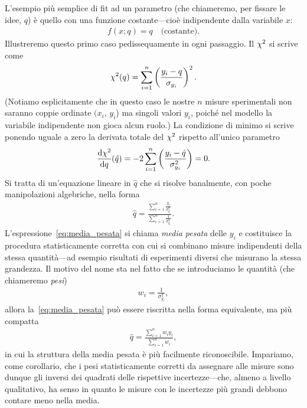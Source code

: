 L'esempio più semplice di fit ad un parametro (che chiameremo, per fissare
le idee, $q$) è quello con una funzione costante---cioè indipendente dalla
variabile $x$:
\begin{align*}
  f(x; q) = q \quad \text{(costante)}.
\end{align*}
Illustreremo questo primo caso pedissequamente in ogni passaggio. Il $\chi^2$
si scrive come
\begin{align*}
  \chisquare{q} = \sum_{i = 1}^{n}\left(\frac{y_i - q}{\sigma_{y_i}}\right)^2.
\end{align*}
(Notiamo esplicitamente che in questo caso le nostre $n$ misure sperimentali non
saranno coppie ordinate $(x_i$, $y_i$) ma singoli valori $y_i$, poiché nel
modello la variabile indipendente non gioca alcun ruolo.) La condizione di
minimo si scrive ponendo uguale a zero la derivata totale del $\chi^2$ rispetto
all'unico parametro
\begin{align}\label{eq:min_chisq_const}
  \td{\chisq}{q}{\hat{q}} =
  -2 \sum_{i = 1}^{n} \left(\frac{y_i - \hat{q}}{\sigma^2_{y_i}}\right) = 0.
\end{align}
Si tratta di un'equazione lineare in $\hat{q}$ che si risolve banalmente, con
poche manipolazioni algebriche, nella forma
\begin{align}\label{eq:media_pesata}
  \hat{q} = \frac{\sum_{i = 1}^{n}\frac{y_i}{\sigma^2_{y_i}}}%
      {\sum_{i = 1}^{n}\frac{1}{\sigma^2_{y_i}}}.
\end{align}
L'espressione~\eqref{eq:media_pesata} si chiama \emph{media pesata} delle $y_i$
e costituisce la procedura statisticamente corretta con cui si combinano misure
indipendenti della stessa quantità---ad esempio risultati di esperimenti
diversi che misurano la stessa grandezza. Il motivo del nome sta nel fatto che
se introduciamo le quantità (che chiameremo \emph{pesi})
\begin{align*}
  w_i = \frac{1}{\sigma^2_{y_i}},
\end{align*}
allora la~\eqref{eq:media_pesata} può essere riscritta nella forma
equivalente, ma più compatta
\begin{align}\label{eq:media_pesata_2}
  \hat{q} = \frac{\sum_{i = 1}^{n} w_iy_i}{\sum_{i = 1}^{n}w_i},
\end{align}
in cui la struttura della media pesata è più facilmente riconoscibile.
Impariamo, come corollario, che i pesi statisticamente corretti da assegnare
alle misure sono dunque gli inversi dei quadrati delle rispettive
incertezze---che, almeno a livello qualitativo, ha senso in quanto le misure
con le incertezze più grandi debbono contare meno nella media.

